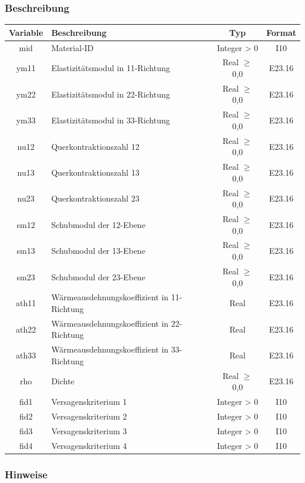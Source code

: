 \documentclass[11pt,titlepage,listof=totoc,bibliography=totoc,twoside]{scrreprt}
\begin{document}
{{\subsubsection{Beschreibung}

\begin{tabularx}{\textwidth}{cXcc}
\toprule
Variable  & Beschreibung  & Typ          & Format  \\
\midrule
mid       & Material-ID   & Integer > 0  & I10  \\
ym11      & Elastizitätsmodul in 11-Richtung & Real $\geq$ 0{,}0 & E23.16  \\
ym22      & Elastizitätsmodul in 22-Richtung & Real $\geq$ 0{,}0 & E23.16  \\
ym33      & Elastizitätsmodul in 33-Richtung & Real $\geq$ 0{,}0 & E23.16  \\
nu12      & Querkontraktionszahl 12 & Real $\geq$ 0{,}0 & E23.16  \\
nu13      & Querkontraktionszahl 13 & Real $\geq$ 0{,}0 & E23.16  \\
nu23      & Querkontraktionszahl 23 & Real $\geq$ 0{,}0 & E23.16  \\
sm12      & Schubmodul der 12-Ebene & Real $\geq$ 0{,}0 & E23.16  \\
sm13      & Schubmodul der 13-Ebene & Real $\geq$ 0{,}0 & E23.16  \\
sm23      & Schubmodul der 23-Ebene & Real $\geq$ 0{,}0 & E23.16  \\
ath11     & Wärmeausdehnungskoeffizient in 11-Richtung & Real    & E23.16  \\
ath22     & Wärmeausdehnungskoeffizient in 22-Richtung & Real    & E23.16  \\
ath33     & Wärmeausdehnungskoeffizient in 33-Richtung & Real    & E23.16  \\
rho       & Dichte                  & Real $\geq$ 0{,}0 & E23.16  \\
fid1      & Versagenskriterium 1    & Integer > 0       & I10     \\
fid2      & Versagenskriterium 2    & Integer > 0       & I10     \\
fid3      & Versagenskriterium 3    & Integer > 0       & I10     \\
fid4      & Versagenskriterium 4    & Integer > 0       & I10     \\
\bottomrule
\end{tabularx}

\subsubsection{Hinweise}

}}
\end{document}
